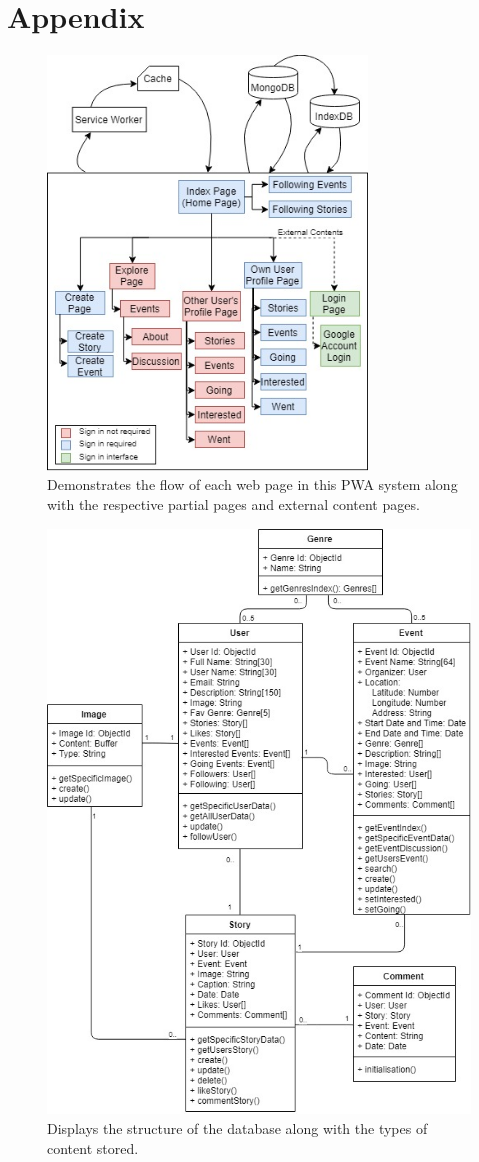 \documentclass[11pt, a4paper]{article}
\begin{document}
\section{Appendix}
\begin{figure}[H]
  \begin{center}
    \includegraphics[width=8.5cm]{site_map.jpg}
    \caption{Demonstrates the flow of each web page in this PWA system along with the respective
    partial pages and external content pages.}
    \label{figure:site_map}
  \end{center}
\end{figure}
\begin{figure}[H]
  \begin{center}
    \includegraphics[width=15cm]{uml.jpg}
    \caption{Displays the structure of the database along with the types of content stored.}
    \label{figure:uml}
  \end{center}
\end{figure}
\end{document}
